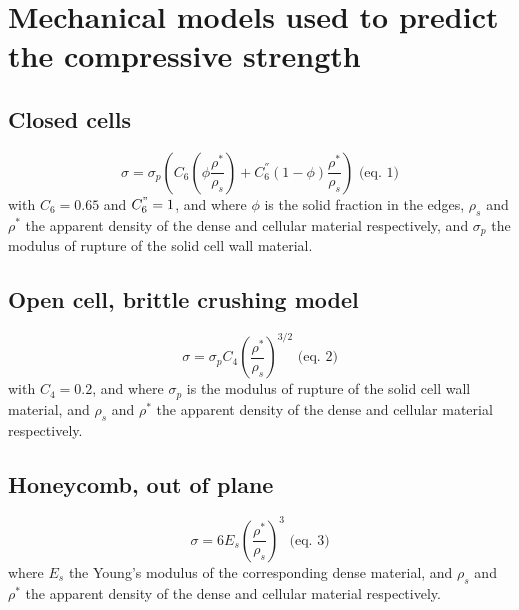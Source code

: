 \documentclass[11pt]{article}
\begin{document}
    \hypertarget{mechanical-models-used-to-predict-the-compressive-strength}{%
\section{Mechanical models used to predict the compressive
strength}\label{mechanical-models-used-to-predict-the-compressive-strength}}

\hypertarget{closed-cells}{%
\subsection{Closed cells}\label{closed-cells}}

\[\sigma=\sigma_{p}\left(C_6\left(\phi\frac{\rho^*}{\rho_s}\right)+C_{6}^{''}\left(1-\phi\right)\frac{\rho^*}{\rho_s}\right) \text{  (eq. 1)}\]
with \(C_6=0.65\) and \(C_6^"=1\), and where \(\phi\) is the solid
fraction in the edges, \(\rho_s\) and \(\rho^*\) the apparent density of
the dense and cellular material respectively, and \(\sigma_p\) the
modulus of rupture of the solid cell wall material.

\hypertarget{open-cell-brittle-crushing-model}{%
\subsection{Open cell, brittle crushing
model}\label{open-cell-brittle-crushing-model}}

\[\sigma=\sigma_{p}C_4\left(\frac{\rho^*}{\rho_s}\right)^{3/2}\text{  (eq. 2)}\]
with \(C_4=0.2\), and where \(\sigma_{p}\) is the modulus of rupture of
the solid cell wall material, and \(\rho_s\) and \(\rho^*\) the apparent
density of the dense and cellular material respectively.

\hypertarget{honeycomb-out-of-plane}{%
\subsection{Honeycomb, out of plane}\label{honeycomb-out-of-plane}}

\[\sigma=6 E_s \left(\frac{\rho^*}{\rho_s}\right)^3 \text{  (eq. 3)}\]
where \(E_s\) the Young's modulus of the corresponding dense material,
and \(\rho_s\) and \(\rho^*\) the apparent density of the dense and
cellular material respectively.
\end{document}
